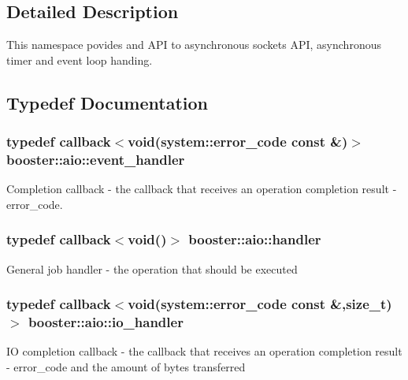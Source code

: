 \subsection{Detailed Description}
This namespace povides and A\+PI to asynchronous sockets A\+PI, asynchronous timer and event loop handing. 

\subsection{Typedef Documentation}
\subsubsection[{event\+\_\+handler}]{\setlength{\rightskip}{0pt plus 5cm}typedef {\bf callback}$<$void(system\+::error\+\_\+code const \&)$>$ {\bf booster\+::aio\+::event\+\_\+handler}}\label{namespacebooster_1_1aio_a6f0da1262eee438aff012673690a0930}
Completion callback -\/ the callback that receives an operation completion result -\/ error\+\_\+code. 
\subsubsection[{handler}]{\setlength{\rightskip}{0pt plus 5cm}typedef {\bf callback}$<$void()$>$ {\bf booster\+::aio\+::handler}}\label{namespacebooster_1_1aio_ab53e9a02670be9c7c93a1b54cec00c97}
General job handler -\/ the operation that should be executed 
\subsubsection[{io\+\_\+handler}]{\setlength{\rightskip}{0pt plus 5cm}typedef {\bf callback}$<$void(system\+::error\+\_\+code const \&,size\+\_\+t)$>$ {\bf booster\+::aio\+::io\+\_\+handler}}\label{namespacebooster_1_1aio_ade0aeea672877a3dde3b8ce4b9ac34e5}
IO completion callback -\/ the callback that receives an operation completion result -\/ error\+\_\+code and the amount of bytes transferred 
